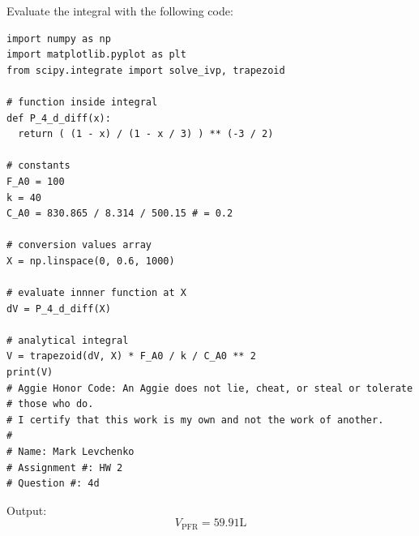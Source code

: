 \documentclass[12pt]{article}
\begin{document}
\begin{enumerate}
\begin{enumerate}
        \newpage
        Evaluate the integral with the following code:
\begin{verbatim}
import numpy as np
import matplotlib.pyplot as plt
from scipy.integrate import solve_ivp, trapezoid

# function inside integral
def P_4_d_diff(x):
  return ( (1 - x) / (1 - x / 3) ) ** (-3 / 2)

# constants
F_A0 = 100
k = 40
C_A0 = 830.865 / 8.314 / 500.15 # = 0.2

# conversion values array
X = np.linspace(0, 0.6, 1000)

# evaluate innner function at X
dV = P_4_d_diff(X)

# analytical integral
V = trapezoid(dV, X) * F_A0 / k / C_A0 ** 2
print(V)
# Aggie Honor Code: An Aggie does not lie, cheat, or steal or tolerate
# those who do.
# I certify that this work is my own and not the work of another.
#
# Name: Mark Levchenko
# Assignment #: HW 2
# Question #: 4d
\end{verbatim}

        Output:
        \begin{equation*}
            \boxed{V_{\mathrm{PFR}} = 59.91 \mathrm{L}}
        \end{equation*}
        
    \end{enumerate}




    
\end{enumerate}
\end{document}
